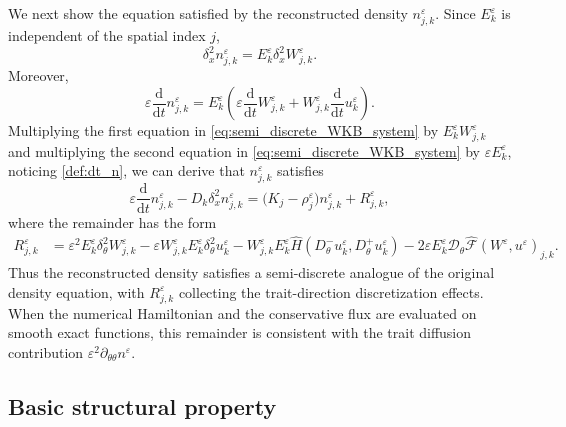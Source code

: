 \documentclass[11pt]{article}
\begin{document}
We next show the equation satisfied by the reconstructed density
\(n_{j,k}^\varepsilon\). Since \(E_k^\varepsilon\) is independent of the
spatial index \(j\),
\[
\delta_x^2 n_{j,k}^\varepsilon
=
E_k^\varepsilon\delta_x^2W_{j,k}^\varepsilon .
\]
Moreover,
\begin{equation}\label{def:dt_n}
\varepsilon\frac{\mathrm d}{\mathrm dt}n_{j,k}^\varepsilon
=
E_k^\varepsilon
\left(
\varepsilon\frac{\mathrm d}{\mathrm dt}W_{j,k}^\varepsilon
+
W_{j,k}^\varepsilon
\frac{\mathrm d}{\mathrm dt}u_k^\varepsilon
\right).
\end{equation}
Multiplying the first equation in \eqref{eq:semi_discrete_WKB_system} by $E_k^\varepsilon W_{j,k}^\varepsilon$ and multiplying the second equation in  \eqref{eq:semi_discrete_WKB_system} by $\varepsilon E_k^\varepsilon$, 
noticing \eqref{def:dt_n},
we can derive that \(n_{j,k}^\varepsilon\) satisfies
\begin{equation}\label{eq:semi_discrete_n}
\varepsilon\frac{\mathrm d}{\mathrm dt} n_{j,k}^\varepsilon
-
D_k\delta_x^2 n_{j,k}^\varepsilon
=
\bigl(K_j-\rho_{j}^\varepsilon\bigr)n_{j,k}^\varepsilon
+
R_{j,k}^\varepsilon ,
\end{equation}
where the remainder has the form 
\begin{align}
R_{j,k}^\varepsilon
&=
\varepsilon^2
E_k^\varepsilon
\delta_\theta^2 W_{j,k}^\varepsilon
-
\varepsilon
W_{j,k}^\varepsilon
E_k^\varepsilon
\delta_\theta^2 u_k^\varepsilon
-
W_{j,k}^\varepsilon
E_k^\varepsilon
\widehat H
\left(
D_\theta^-u_k^\varepsilon,
D_\theta^+u_k^\varepsilon
\right)
-
2\varepsilon
E_k^\varepsilon
\mathcal D_\theta
\widehat{\mathcal F}(W^\varepsilon,u^\varepsilon)_{j,k}.
\label{eq:R_exact}
\end{align}
Thus the reconstructed density satisfies a semi-discrete analogue of the
original density equation, with \(R_{j,k}^\varepsilon\) collecting the
trait-direction discretization effects. When the numerical Hamiltonian and
the conservative flux are evaluated on smooth exact functions, this remainder
is consistent with the trait diffusion contribution
\(\varepsilon^2\partial_{\theta\theta}n^\varepsilon\).






\subsection{Basic structural property}
\end{document}
